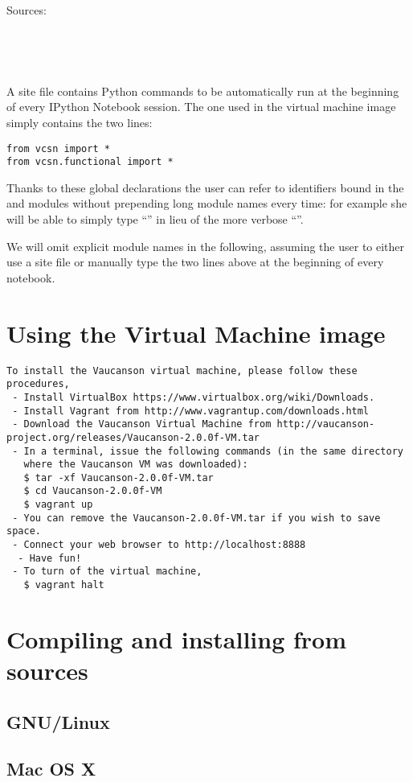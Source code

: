 \FILL



Sources:

\\

\\

A site file contains Python commands to be automatically run at the beginning
of every IPython Notebook session.  The one used in the virtual machine image
simply contains the two lines:
\begin{lstlisting}
from vcsn import *
from vcsn.functional import *
\end{lstlisting}
Thanks to these global declarations the user can refer to identifiers bound in
the  and  modules without prepending long module
names every time: for example she will be able to simply type
``''
in lieu of the more verbose
``''.

We will omit explicit module names in the following, assuming the user to
either use a site file or manually type the two  lines above at
the beginning of every notebook.



\section{Using the Virtual Machine image}

\begin{lstlisting}
To install the Vaucanson virtual machine, please follow these procedures,
 - Install VirtualBox https://www.virtualbox.org/wiki/Downloads.
 - Install Vagrant from http://www.vagrantup.com/downloads.html
 - Download the Vaucanson Virtual Machine from http://vaucanson-project.org/releases/Vaucanson-2.0.0f-VM.tar
 - In a terminal, issue the following commands (in the same directory
   where the Vaucanson VM was downloaded):
   $ tar -xf Vaucanson-2.0.0f-VM.tar
   $ cd Vaucanson-2.0.0f-VM
   $ vagrant up
 - You can remove the Vaucanson-2.0.0f-VM.tar if you wish to save space.
 - Connect your web browser to http://localhost:8888
  - Have fun!
 - To turn of the virtual machine,
   $ vagrant halt
\end{lstlisting}

\section{Compiling and installing from sources}
\subsection{GNU/Linux}
\subsection{Mac OS X}
